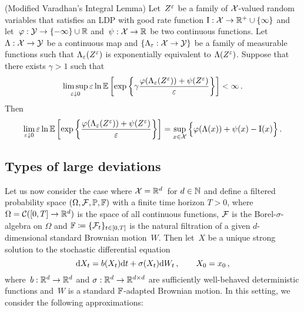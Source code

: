 \begin{theorem}(Modified Varadhan's Integral Lemma)\label{thm:varadhan_modified} %
\sloppy Let~$Z^{\varepsilon}$ be a family of $\mathcal{X}$\nobreakdash-valued random variables that satisfies an LDP with good rate function ${\mathrm{I}:\mathcal{X}\rightarrow \mathbb{R}^+ \cup \{\infty\}}$ and let~${\varphi: \mathcal{Y} \to \{-\infty\} \cup \mathbb{R}}$ and~${\psi: \mathcal{X} \rightarrow \mathbb{R}}$  be two continuous functions. Let~${\Lambda: \mathcal{X} \rightarrow \mathcal{Y}}$ be a continuous map and $\{\Lambda_{\varepsilon} : \mathcal{X} \to \mathcal{Y}\}$ be a family of measurable functions such that $\Lambda_{\varepsilon}(Z^{\varepsilon})$ is exponentially equivalent to $\Lambda(Z^{\varepsilon})$. Suppose that there exists $\gamma > 1$ such that
$$
\limsup\limits_{\varepsilon \downarrow 0}
\varepsilon\ln \mathbb{E}\left[\exp\left\{\gamma \frac{\varphi(\Lambda_{\varepsilon}(Z^{\varepsilon})) + \psi(Z^{\varepsilon})}{\varepsilon}\right\}\right]< \infty\,.
$$
Then
$$
\lim_{\varepsilon \downarrow 0}
\varepsilon\ln \mathbb{E}\left[\exp\left\{\frac{\varphi(\Lambda_{\varepsilon}(Z^{\varepsilon})) + \psi(Z^{\varepsilon})}{\varepsilon}\right\}\right]
= \sup\limits_{x \in \mathcal{X}} \Big\{\varphi(\Lambda(x)) + \psi(x) - \mathrm{I}(x) \Big\}\,.
$$
\end{theorem}


\subsection{Types of large deviations}
Let us now consider the case where $\mathcal{X} = \mathbb{R}^d\,$ for $d\in\mathbb{N}$ and define a filtered probability space $(\Omega, \mathcal{F}, \mathbb{P}, \mathbb{F})$ with a finite time horizon $T>0$, where $\Omega = \mathcal{C}([0,T]\to \mathbb{R}^d)$ is the space of all continuous functions, $\mathcal{F}$ is the Borel-$\sigma$-algebra on $\Omega$ and $\mathbb{F}\coloneqq\{\mathcal{F}_t\}_{t\in[0,T]}$ is the natural filtration of a given $d$-dimensional standard Brownian motion~$W$. Then let~$X$ be a unique strong solution to the stochastic differential equation
\begin{equation}\label{eq:genericSDE}
\mathrm{d} X_t = b(X_t) \mathrm{d} t + \sigma(X_t) \mathrm{d} W_t\,, \qquad X_0 = x_0\,,
\end{equation}
where~$b:\mathbb{R}^d\to \mathbb{R}^d$ and $\sigma:\mathbb{R}^d \to \mathbb{R}^{d\times d}$ are sufficiently well-behaved
deterministic functions and~$W$ is a standard $\mathbb{F}$-adapted Brownian motion. In this setting, we consider the following approximations:

